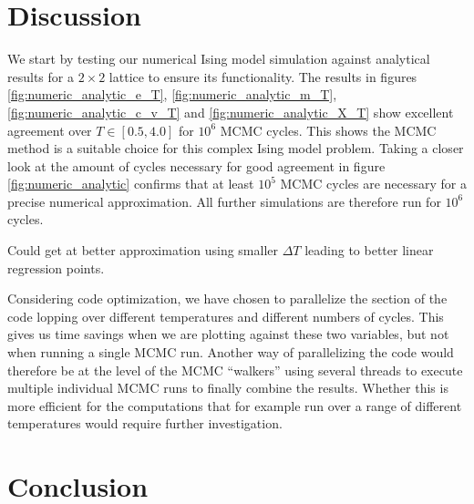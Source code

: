 \documentclass[english,notitlepage,reprint,nofootinbib]{revtex4-1}  %
\begin{document}
\section{Discussion}\label{sec:discussion}
We start by testing our numerical Ising model simulation against analytical results for a $2 \times 2$ lattice to ensure its functionality. The results in figures \ref{fig:numeric_analytic_e_T}, \ref{fig:numeric_analytic_m_T}, \ref{fig:numeric_analytic_c_v_T} and \ref{fig:numeric_analytic_X_T} show excellent agreement over $T \in [0.5, 4.0]$ for $10^6$ MCMC cycles. This shows the MCMC method is a suitable choice for this complex Ising model problem. Taking a closer look at the amount of cycles necessary for good agreement in figure \ref{fig:numeric_analytic} confirms that at least $10^5$ MCMC cycles are necessary for a precise numerical approximation. All further simulations are therefore run for $10^6$ cycles. 



Could get at better approximation using smaller $\Delta T$ leading to better linear regression points.

Considering code optimization, we have chosen to parallelize the section of the code lopping over different temperatures and different numbers of cycles. This gives us time savings when we are plotting against these two variables, but not when running a single MCMC run. Another way of parallelizing the code would therefore be at the level of the MCMC ``walkers'' using several threads to execute multiple individual MCMC runs to finally combine the results. Whether this is more efficient for the computations that for example run over a range of different temperatures would require further investigation. 
\section{Conclusion}\label{sec:conclusion}



\onecolumngrid

%


\newpage
\appendix
\raggedbottom
\end{document}
